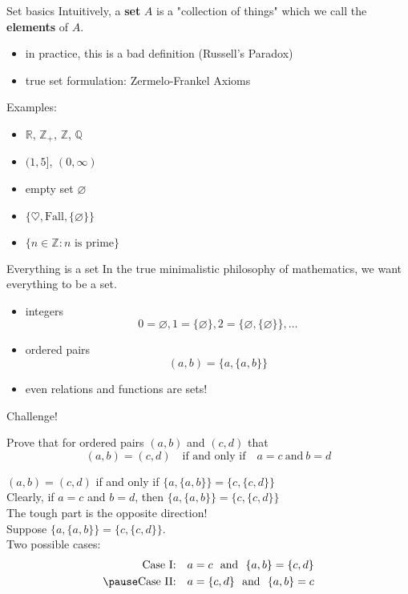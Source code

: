 \documentclass{beamer}
\begin{document}
\begin{frame}{Set basics}
Intuitively, a \textbf{set} $A$ is a "collection of things" which we call the \textbf{elements} of $A$.
\begin{itemize}
\pause
\item in practice, this is a bad definition (Russell's Paradox)
\pause
\item true set formulation: Zermelo-Frankel Axioms
\end{itemize}
\pause
Examples:
\begin{itemize}
\pause
\item $\mathbb R$, $\mathbb{Z}_+$, $\mathbb{Z}$, $\mathbb{Q}$
\pause
\item $(1,5]$, $(0,\infty)$
\pause
\item empty set $\varnothing$
\pause
\item $\{\heartsuit,\text{Fall}, \{\varnothing\}\}$
\pause
\item $\{n\in \mathbb{Z}: \text{$n$ is prime}\}$
\end{itemize}
\end{frame}

\begin{frame}{Everything is a set}
In the true minimalistic philosophy of mathematics, we want everything to be a set.
\begin{itemize}
\pause
\item integers
\pause
$$0 = \varnothing, 1 = \{\varnothing\}, 2 = \{\varnothing,\{\varnothing\}\},\dots$$
\pause
\item ordered pairs
\pause
$$(a,b) = \{a,\{a,b\}\}$$
\pause
\item even relations and functions are sets!
\end{itemize}
\end{frame}

\begin{frame}{Challenge!}
\begin{prob}
Prove that for ordered pairs $(a,b)$ and $(c,d)$ that
$$(a,b)=(c,d)\quad\text{if and only if}\quad a=c\ \text{and}\ b=d$$
\end{prob}
\pause
\begin{soln}
$(a,b)=(c,d)$ if and only if $\{a,\{a,b\}\}=\{c,\{c,d\}\}$\\
\pause
Clearly, if $a=c$ and $b=d$, then $\{a,\{a,b\}\}=\{c,\{c,d\}\}$\\
\pause
The tough part is the opposite direction!\\
\pause
Suppose $\{a,\{a,b\}\}=\{c,\{c,d\}\}$.\\
\pause
Two possible cases:
\pause
\begin{align*}
\text{Case I:}\quad a=c\ \ \text{and}\ \  \{a,b\} = \{c,d\}\\
\pause
\text{Case II:}\quad a=\{c,d\}\ \ \text{and}\ \ \{a,b\} = c
\end{align*}
\end{soln}
\end{frame}
\end{document}
